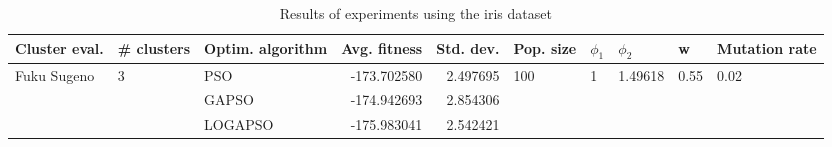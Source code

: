 \begin{table}
\centering
\caption{Results of experiments using the iris dataset}
\begin{tabular}{lllrrlllll}
\toprule
               Cluster eval. &        \# clusters & Optim. algorithm &  Avg. fitness &  Std. dev. &            Pop. size &         $\phi_{1}$ &               $\phi_{2}$ &                     w &         Mutation rate \\
\midrule
\multirow{3}{*}{Fuku Sugeno} & \multirow{3}{*}{3} &              PSO &   -173.702580 &   2.497695 & \multirow{3}{*}{100} & \multirow{3}{*}{1} & \multirow{3}{*}{1.49618} & \multirow{3}{*}{0.55} & \multirow{3}{*}{0.02} \\
                             &                    &            GAPSO &   -174.942693 &   2.854306 &                      &                    &                          &                       &                       \\
                             &                    &          LOGAPSO &   -175.983041 &   2.542421 &                      &                    &                          &                       &                       \\
\bottomrule
\end{tabular}
\end{table}
